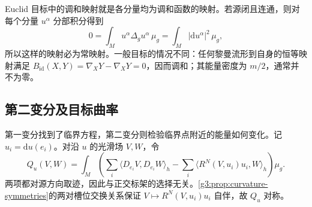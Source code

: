\begin{example}\label{g3:exm:harmonic-map-elementary}
	Euclid 目标中的调和映射就是各分量均为调和函数的映射。若源闭且连通，则对每个分量 \(u^\alpha\) 分部积分得到
	\[
		0=\int_Mu^\alpha\Delta_g u^\alpha\,\mu_g
		=\int_M|\mathrm du^\alpha|^2\,\mu_g,
	\]
	所以这样的映射必为常映射。一般目标的情况不同：任何黎曼流形到自身的恒等映射满足 \(B_{\operatorname{id}}(X,Y)=\nabla_XY-\nabla_XY=0\)，因而调和；其能量密度为 \(m/2\)，通常并不为零。
\end{example}

\subsection{第二变分及目标曲率}
\label{g3:subsec:1801:03}
第一变分找到了临界方程，第二变分则检验临界点附近的能量如何变化。记 \(u_i=\mathrm du(e_i)\)。对沿 \(u\) 的光滑场 \(V,W\)，令
\begin{equation}\label{g3:eq:harmonic-map-index-form}
	Q_u(V,W)=\int_M\left(\sum_i\langle D_{e_i}V,D_{e_i}W\rangle_h
	-\sum_i\langle R^N(V,u_i)u_i,W\rangle_h\right)\mu_g.
\end{equation}
两项都对源方向取迹，因此与正交标架的选择无关。\cref{g3:prop:curvature-symmetries}的两对槽位交换关系保证 \(V\mapsto R^N(V,u_i)u_i\) 自伴，故 \(Q_u\) 对称。

